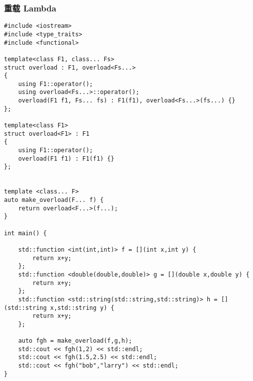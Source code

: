 \documentclass{article}
\begin{document}
\subsubsection{重载 Lambda}
\begin{verbatim}
#include <iostream>
#include <type_traits>
#include <functional>

template<class F1, class... Fs>
struct overload : F1, overload<Fs...>
{
    using F1::operator();
    using overload<Fs...>::operator();
    overload(F1 f1, Fs... fs) : F1(f1), overload<Fs...>(fs...) {}
};

template<class F1>
struct overload<F1> : F1
{
    using F1::operator();
    overload(F1 f1) : F1(f1) {}
};


template <class... F>
auto make_overload(F... f) {
    return overload<F...>(f...);
}

int main() {

    std::function <int(int,int)> f = [](int x,int y) {
        return x+y;
    };
    std::function <double(double,double)> g = [](double x,double y) {
        return x+y;
    };
    std::function <std::string(std::string,std::string)> h = [](std::string x,std::string y) {
        return x+y;
    };

    auto fgh = make_overload(f,g,h);
    std::cout << fgh(1,2) << std::endl;
    std::cout << fgh(1.5,2.5) << std::endl;
    std::cout << fgh("bob","larry") << std::endl;
}
\end{verbatim}


\end{document}
